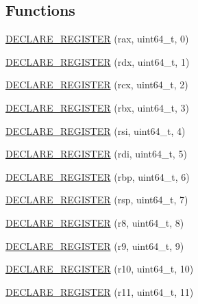 \subsection*{Functions}
\begin{DoxyCompactItemize}
\item 
\mbox{\hyperlink{namespacexd_1_1reg_1_1x86__64_a58cd35e6e8e9d6173100aaab5f81704b}{D\+E\+C\+L\+A\+R\+E\+\_\+\+R\+E\+G\+I\+S\+T\+ER}} (rax, uint64\+\_\+t, 0)
\item 
\mbox{\hyperlink{namespacexd_1_1reg_1_1x86__64_a604ac61032ce3c1fcd2039fb0877688e}{D\+E\+C\+L\+A\+R\+E\+\_\+\+R\+E\+G\+I\+S\+T\+ER}} (rdx, uint64\+\_\+t, 1)
\item 
\mbox{\hyperlink{namespacexd_1_1reg_1_1x86__64_a1f960f86814fead39be71ee35d0bcda4}{D\+E\+C\+L\+A\+R\+E\+\_\+\+R\+E\+G\+I\+S\+T\+ER}} (rcx, uint64\+\_\+t, 2)
\item 
\mbox{\hyperlink{namespacexd_1_1reg_1_1x86__64_a62b3ca249d87a244d99589effdeaca78}{D\+E\+C\+L\+A\+R\+E\+\_\+\+R\+E\+G\+I\+S\+T\+ER}} (rbx, uint64\+\_\+t, 3)
\item 
\mbox{\hyperlink{namespacexd_1_1reg_1_1x86__64_acc1a38581c0654f3e5ad684ae21e2caf}{D\+E\+C\+L\+A\+R\+E\+\_\+\+R\+E\+G\+I\+S\+T\+ER}} (rsi, uint64\+\_\+t, 4)
\item 
\mbox{\hyperlink{namespacexd_1_1reg_1_1x86__64_aada7b4dba3da257a59640049c1eed99d}{D\+E\+C\+L\+A\+R\+E\+\_\+\+R\+E\+G\+I\+S\+T\+ER}} (rdi, uint64\+\_\+t, 5)
\item 
\mbox{\hyperlink{namespacexd_1_1reg_1_1x86__64_a30f6c98c522dd6564caf45de5c437d02}{D\+E\+C\+L\+A\+R\+E\+\_\+\+R\+E\+G\+I\+S\+T\+ER}} (rbp, uint64\+\_\+t, 6)
\item 
\mbox{\hyperlink{namespacexd_1_1reg_1_1x86__64_a3ee0d419d8f900ff3db661a6a164a68f}{D\+E\+C\+L\+A\+R\+E\+\_\+\+R\+E\+G\+I\+S\+T\+ER}} (rsp, uint64\+\_\+t, 7)
\item 
\mbox{\hyperlink{namespacexd_1_1reg_1_1x86__64_a0f2bc9a9e14021ba13759c6a077449f7}{D\+E\+C\+L\+A\+R\+E\+\_\+\+R\+E\+G\+I\+S\+T\+ER}} (r8, uint64\+\_\+t, 8)
\item 
\mbox{\hyperlink{namespacexd_1_1reg_1_1x86__64_a21ee173dc3e6db78bddb47a53a1adf8e}{D\+E\+C\+L\+A\+R\+E\+\_\+\+R\+E\+G\+I\+S\+T\+ER}} (r9, uint64\+\_\+t, 9)
\item 
\mbox{\hyperlink{namespacexd_1_1reg_1_1x86__64_a690bd411ae64778521310f687425d24e}{D\+E\+C\+L\+A\+R\+E\+\_\+\+R\+E\+G\+I\+S\+T\+ER}} (r10, uint64\+\_\+t, 10)
\item 
\mbox{\hyperlink{namespacexd_1_1reg_1_1x86__64_a1305f1766baf608bd7a5409590067adc}{D\+E\+C\+L\+A\+R\+E\+\_\+\+R\+E\+G\+I\+S\+T\+ER}} (r11, uint64\+\_\+t, 11)

\end{DoxyCompactItemize}
